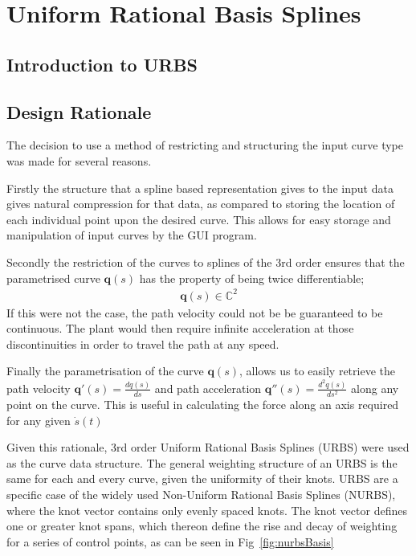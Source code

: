 \section{Uniform Rational Basis Splines}

\subsection{Introduction to URBS}


\subsection{Design Rationale}


The decision to use a method of restricting and structuring the input curve type was made for several reasons. 

Firstly the structure that a spline based representation gives to the input data gives natural compression for that data, as compared to storing the location of each individual point upon the desired curve. This allows for easy storage and manipulation of input curves by the GUI program. 

Secondly the restriction of the curves to splines of the 3rd order ensures that the parametrised curve $\textbf{q}(s)$ has the property of being twice differentiable;
\begin{align*}
\textbf{q}(s) \in \mathbb{C}^2
\end{align*}
If this were not the case, the path velocity could not be be guaranteed to be continuous. The plant would then require infinite acceleration at those discontinuities in order to travel the path at any speed. 

Finally the parametrisation of the curve $\textbf{q}(s)$, allows us to easily retrieve the path velocity $\textbf{q}'(s) = \frac{dq(s)}{ds}$ and path acceleration $\textbf{q}''(s) =  \frac{d^2q(s)}{ds^2}$ along any point on the curve. This is useful in calculating the force along an axis required for any given $\dot{s}(t)$

Given this rationale, 3rd order Uniform Rational Basis Splines (URBS) were used as the curve data structure. The general weighting structure of an URBS is the same for each and every curve, given the uniformity of their knots. URBS are a specific case of the widely used Non-Uniform Rational Basis Splines (NURBS), where the knot vector contains only evenly spaced knots. The knot vector defines one or greater knot spans, which thereon define the rise and decay of weighting for a series of control points, as can be seen in Fig~\ref{fig:nurbsBasis} 

